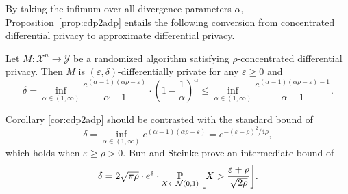 \documentclass{jpc}
\newcommand{\pr}[2]{{\ifx&#1& \mathbb{P} \else
\underset{#1}{\mathbb{P}} \fi \left[#2\right]}}
\newcommand{\eps}{\varepsilon}
\begin{document}
By taking the infimum over all divergence parameters $\alpha$, Proposition~\ref{prop:cdp2adp} entails the following conversion from concentrated differential privacy to approximate differential privacy.

\begin{cor}\label{cor:cdp2adp}
Let $M\colon \mathcal{X}^n \to \mathcal{Y}$ be a randomized algorithm satisfying $\rho$-concentrated differential privacy. 
Then $M$ is $(\eps,\delta)$-differentially private for any $\eps\ge0$ and
\begin{equation}
    \delta= \inf_{\alpha \in (1,\infty)} \frac{e^{(\alpha-1)(\alpha\rho-\eps)}}{\alpha-1} \cdot \left(1-\frac{1}{\alpha}\right)^\alpha \le \inf_{\alpha \in (1,\infty)} \frac{e^{(\alpha-1)(\alpha\rho-\eps)-1}}{\alpha-1}.\label{eq:cdp2adp}
\end{equation}
\end{cor}
Corollary \ref{cor:cdp2adp} should be contrasted with the standard bound \citep{DworkRV10,DworkR16,BunS16,Mironov17} of
\begin{equation}
    \delta = \inf_{\alpha \in (1,\infty)} e^{(\alpha-1)(\alpha\rho-\eps)} = e^{-(\eps-\rho)^2/4\rho},
\end{equation}
which holds when $\eps\ge\rho>0$. Bun and Steinke \cite{BunS16} prove an intermediate bound of
\begin{equation}
    \delta = 2\sqrt{\pi\rho} \cdot e^\eps \cdot \pr{X \gets \mathcal{N}(0,1)}{X>\frac{\eps+\rho}{\sqrt{2\rho}}}.
\end{equation}
\end{document}
